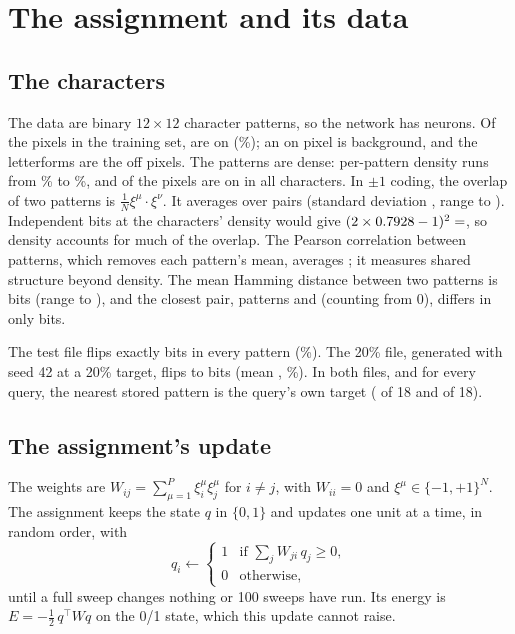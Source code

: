 \section{The assignment and its data}
\label{sec:data}

\subsection{The characters}

The data are  binary $12 \times 12$ character patterns, so the network has  neurons. Of the  pixels in the training set,  are on (\%); an on pixel is background, and the letterforms are the off pixels. The patterns are dense: per-pattern density runs from \% to \%, and  of the  pixels are on in all  characters. In $\pm 1$ coding, the overlap of two patterns is $\frac{1}{N}\xi^\mu \cdot \xi^\nu$. It averages  over pairs (standard deviation , range  to ). Independent bits at the characters' density would give $(2 \times 0.7928 - 1)^2 = \N{d:overlap_indep}$, so density accounts for much of the overlap. The Pearson correlation between patterns, which removes each pattern's mean, averages ; it measures shared structure beyond density. The mean Hamming distance between two patterns is  bits (range  to ), and the closest pair, patterns  and  (counting from 0), differs in only  bits.

The test file flips exactly  bits in every pattern (\%). The 20\% file, generated with seed 42 at a 20\% target, flips  to  bits (mean , \%). In both files, and for every query, the nearest stored pattern is the query's own target ( of 18 and  of 18).

\subsection{The assignment's update}

The weights are $W_{ij} = \sum_{\mu=1}^{P} \xi_i^\mu \xi_j^\mu$ for $i \neq j$, with $W_{ii} = 0$ and $\xi^\mu \in \{-1, +1\}^N$. The assignment keeps the state $q$ in $\{0, 1\}$ and updates one unit at a time, in random order, with
\begin{equation}
q_i \leftarrow \begin{cases} 1 & \text{if } \sum_j W_{ji}\, q_j \ge 0,\\ 0 & \text{otherwise,}\end{cases} \label{eq:update01}
\end{equation}
until a full sweep changes nothing or 100 sweeps have run. Its energy is $E = -\tfrac{1}{2}\, q^\top W q$ on the 0/1 state, which this update cannot raise.

